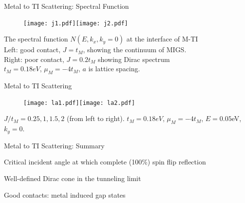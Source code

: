 \documentclass[]{beamer}
\begin{document}
\begin{frame}{Metal to TI Scattering: Spectral Function}

\begin{figure}
\center
\texttt{[image: j1.pdf]}\texttt{[image: j2.pdf]}
\end{figure}
The spectral function $N(E,k_x,k_y=0)$ at the interface of M-TI\\
Left:  good contact, $J=t_M$, showing the continuum of MIGS. \\
Right: poor contact, $J=0.2t_M$ showing Dirac spectrum\\
$t_M=0.18eV$, $\mu_M=-4t_M$, $a$ is lattice spacing.
 
\end{frame}




\begin{frame}{Metal to TI Scattering}

\begin{figure}
\center
\texttt{[image: la1.pdf]}\texttt{[image: la2.pdf]}
\end{figure}

$J/t_M=0.25, 1, 1.5, 2$ (from left to right). $t_M=0.18eV$, $\mu_M=-4t_M$, $E=0.05$eV, $k_y=0$.
\end{frame}




\begin{frame}{Metal to TI Scattering: Summary}
\begin{list}{*}{}
\item Critical incident angle at which complete (100\%) spin flip reflection\\ 
\item Well-defined Dirac cone in the tunneling limit\\ 
\item Good contacts: metal induced gap states
\end{list}
\end{frame}



\end{document}

